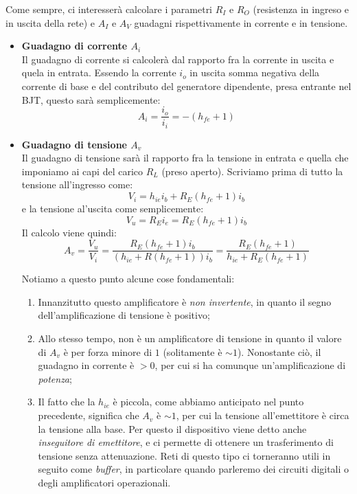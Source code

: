 \documentclass[a4paper,11pt]{article}
\begin{document}
Come sempre, ci interesserà calcolare i parametri $R_I$ e $R_O$ (resistenza in ingreso e in uscita della rete) e $A_I$ e $A_V$ guadagni rispettivamente in corrente e in tensione.

\begin{itemize}
	\item \textbf{\textsf{Guadagno di corrente $A_i$}} \\
Il guadagno di corrente si calcolerà dal rapporto fra la corrente in uscita e quela in entrata. Essendo la corrente $i_o$ in uscita somma negativa della corrente di base e del contributo del generatore dipendente, presa entrante nel BJT, questo sarà semplicemente:
$$
A_i = \frac{i_o}{i_i} = -(h_{fe} + 1)
$$

	\item \textbf{\textsf{Guadagno di tensione $A_v$}} \\
Il guadagno di tensione sarà il rapporto fra la tensione in entrata e quella che imponiamo ai capi del carico $R_L$ (preso aperto). Scriviamo prima di tutto la tensione all'ingresso come:
$$
V_i = h_{ie} i_b + R_E (h_{fe} + 1) i_b
$$
e la tensione al'uscita come semplicemente:
$$
V_u = R_E i_e = R_E (h_{fe} + 1) i_b
$$
Il calcolo viene quindi:
$$
A_v = \frac{V_u}{V_i} = \frac{R_E (h_{fe} + 1) i_b}{(h_{ie} + R (h_{fe} + 1)) i_b}
= \frac{R_E (h_{fe} + 1)}{h_{ie} + R_E (h_{fe} + 1)}
$$

Notiamo a questo punto alcune cose fondamentali:
\begin{enumerate}
	\item Innanzitutto questo amplificatore è \textit{non invertente}, in quanto il segno dell'amplificazione di tensione è positivo;
	\item Allo stesso tempo, non è un amplificatore di tensione in quanto il valore di $A_v$ è per forza minore di $1$ (solitamente è $\sim 1$). Nonostante ciò, il guadagno in corrente è $> 0$, per cui si ha comunque un'amplificazione di \textit{potenza};
	\item Il fatto che la $h_{ie}$ è piccola, come abbiamo anticipato nel punto precedente, significa che $A_v$ è $\sim 1$, per cui la tensione all'emettitore è circa la tensione alla base. Per questo il dispositivo viene detto anche \textit{inseguitore di emettitore}, e ci permette di ottenere un trasferimento di tensione senza attenuazione. Reti di questo tipo ci torneranno utili in seguito come \textit{buffer}, in particolare quando parleremo dei circuiti digitali o degli amplificatori operazionali. 
\end{enumerate}


\end{itemize}
\end{document}
